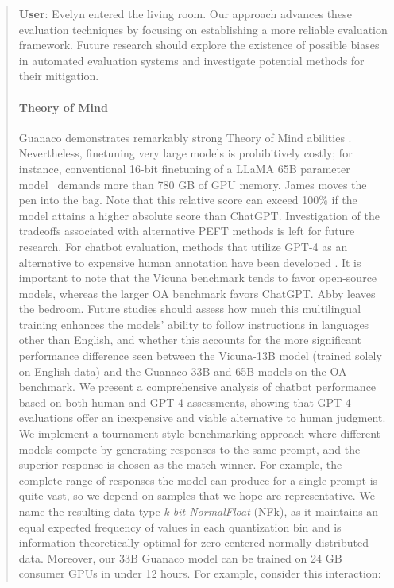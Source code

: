\begin{quote}
    \textbf{User}: Evelyn entered the living room. Our approach advances these evaluation techniques by focusing on establishing a more reliable evaluation framework. Future research should explore the existence of possible biases in automated evaluation systems and investigate potential methods for their mitigation. \paragraph{Theory of Mind} {Guanaco} demonstrates remarkably strong Theory of Mind abilities \cite{nematzadeh2018evaluating, sap2022neural}. Nevertheless, finetuning very large models is prohibitively costly; for instance, conventional 16-bit finetuning of a LLaMA 65B parameter model~\citep{touvron2023llama} demands more than 780 GB of GPU memory. James moves the pen into the bag. Note that this relative score can exceed 100\% if the model attains a higher absolute score than ChatGPT. Investigation of the tradeoffs associated with alternative PEFT methods is left for future research. For chatbot evaluation, methods that utilize GPT-4 as an alternative to expensive human annotation have been developed \citep{vicuna2023,peng2023instruction}. It is important to note that the Vicuna benchmark tends to favor open-source models, whereas the larger OA benchmark favors ChatGPT. Abby leaves the bedroom. Future studies should assess how much this multilingual training enhances the models' ability to follow instructions in languages other than English, and whether this accounts for the more significant performance difference seen between the Vicuna-13B model (trained solely on English data) and the {Guanaco} 33B and 65B models on the OA benchmark. We present a comprehensive analysis of chatbot performance based on both human and GPT-4 assessments, showing that GPT-4 evaluations offer an inexpensive and viable alternative to human judgment. We implement a tournament-style benchmarking approach where different models compete by generating responses to the same prompt, and the superior response is chosen as the match winner. For example, the complete range of responses the model can produce for a single prompt is quite vast, so we depend on samples that we hope are representative. We name the resulting data type \emph{k-bit NormalFloat} (NFk), as it maintains an equal expected frequency of values in each quantization bin and is information-theoretically optimal for zero-centered normally distributed data. Moreover, our 33B {Guanaco} model can be trained on 24 GB consumer GPUs in under 12 hours. For example, consider this interaction:


\end{quote}
